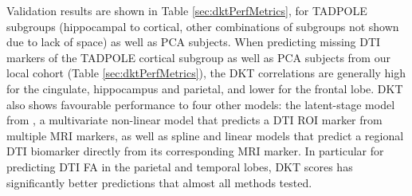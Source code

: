 \documentclass{llncs}
\begin{document}
Validation results are shown in Table \ref{sec:dktPerfMetrics}, for TADPOLE subgroups (hippocampal to cortical, other combinations of subgroups not shown due to lack of space) as well as PCA subjects. When predicting missing DTI markers of the TADPOLE cortical subgroup as well as PCA subjects from our local cohort (Table \ref{sec:dktPerfMetrics}), the DKT correlations are generally high for the cingulate, hippocampus and parietal, and lower for the frontal lobe. DKT also shows favourable performance to four other models: the latent-stage model from \cite{jedynak2012computational}, a multivariate non-linear model that predicts a DTI ROI marker from multiple MRI markers, as well as spline and linear models that predict a regional DTI biomarker directly from its corresponding MRI marker. In particular for predicting DTI FA in the parietal and temporal lobes, DKT scores has significantly better predictions that almost all methods tested.

\newcommand{\cw}{c}
\end{document}
